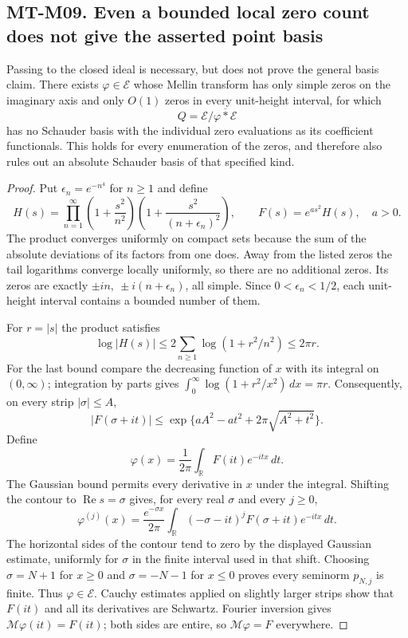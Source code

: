\subsection*{MT-M09. Even a bounded local zero count does not give the asserted point basis}
Passing to the closed ideal is necessary, but does not prove the
general basis claim. There exists $\varphi\in\mathcal E$ whose Mellin
transform has only simple zeros on the imaginary axis and only
$O(1)$ zeros in every unit-height interval, for which
\[
        Q=\mathcal E/\overline{\varphi*\mathcal E}
\]
has no Schauder basis with the individual zero evaluations as its
coefficient functionals. This holds for every enumeration of the
zeros, and therefore also rules out an absolute Schauder basis of
that specified kind.

\begin{proof}
Put $\epsilon_n=e^{-n^4}$ for $n\ge1$ and define
\[
 H(s)=\prod_{n=1}^{\infty}
       \left(1+\frac{s^2}{n^2}\right)
       \left(1+\frac{s^2}{(n+\epsilon_n)^2}\right),
 \qquad F(s)=e^{as^2}H(s),\quad a>0.
\]
The product converges uniformly on compact sets because the sum of
the absolute deviations of its factors from one does. Away from the
listed zeros the tail logarithms converge locally uniformly, so
there are no additional zeros. Its zeros are exactly
$\pm in,\ \pm i(n+\epsilon_n)$, all simple. Since
$0<\epsilon_n<1/2$, each unit-height interval contains a bounded
number of them.

For $r=|s|$ the product satisfies
\[
 \log|H(s)|\le2\sum_{n\ge1}\log(1+r^2/n^2)\le2\pi r.
\]
For the last bound compare the decreasing function of $x$ with its
integral on $(0,\infty)$; integration by parts gives
$\int_0^\infty\log(1+r^2/x^2)\,dx=\pi r$.
Consequently, on every strip $|\sigma|\le A$,
\[
 |F(\sigma+it)|
 \le \exp\{aA^2-at^2+2\pi\sqrt{A^2+t^2}\}.
\]
Define
\[
 \varphi(x)=\frac1{2\pi}\int_{\mathbb R}F(it)e^{-itx}\,dt.
\]
The Gaussian bound permits every derivative in $x$ under the integral.
Shifting the contour to $\operatorname{Re}s=\sigma$ gives, for
every real $\sigma$ and every $j\ge0$,
\[
 \varphi^{(j)}(x)
   =\frac{e^{-\sigma x}}{2\pi}
      \int_{\mathbb R}(-\sigma-it)^jF(\sigma+it)e^{-itx}\,dt.
\]
The horizontal sides of the contour tend to zero by the displayed
Gaussian estimate, uniformly for $\sigma$ in the finite interval
used in that shift. Choosing $\sigma=N+1$ for $x\ge0$ and
$\sigma=-N-1$ for $x\le0$ proves every seminorm $p_{N,j}$ is finite.
Thus $\varphi\in\mathcal E$. Cauchy estimates applied on slightly
larger strips show that $F(it)$ and all its derivatives are Schwartz.
Fourier inversion gives $\mathcal M\varphi(it)=F(it)$;
both sides are entire, so $\mathcal M\varphi=F$ everywhere.


\end{proof}
